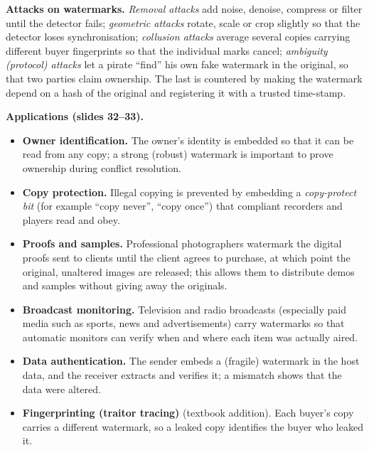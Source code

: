 \textbf{Attacks on watermarks.} \emph{Removal attacks} add noise, denoise, compress or filter until the detector fails; \emph{geometric attacks} rotate, scale or crop slightly so that the detector loses synchronisation; \emph{collusion attacks} average several copies carrying different buyer fingerprints so that the individual marks cancel; \emph{ambiguity (protocol) attacks} let a pirate ``find'' his own fake watermark in the original, so that two parties claim ownership. The last is countered by making the watermark depend on a hash of the original and registering it with a trusted time-stamp.

\textbf{Applications (slides 32--33).}
\begin{itemize}
  \item \textbf{Owner identification.} The owner's identity is embedded so that it can be read from any copy; a strong (robust) watermark is important to prove ownership during conflict resolution.
  \item \textbf{Copy protection.} Illegal copying is prevented by embedding a \emph{copy-protect bit} (for example ``copy never'', ``copy once'') that compliant recorders and players read and obey.
  \item \textbf{Proofs and samples.} Professional photographers watermark the digital proofs sent to clients until the client agrees to purchase, at which point the original, unaltered images are released; this allows them to distribute demos and samples without giving away the originals.
  \item \textbf{Broadcast monitoring.} Television and radio broadcasts (especially paid media such as sports, news and advertisements) carry watermarks so that automatic monitors can verify when and where each item was actually aired.
  \item \textbf{Data authentication.} The sender embeds a (fragile) watermark in the host data, and the receiver extracts and verifies it; a mismatch shows that the data were altered.
  \item \textbf{Fingerprinting (traitor tracing)} (textbook addition). Each buyer's copy carries a different watermark, so a leaked copy identifies the buyer who leaked it.
\end{itemize}

